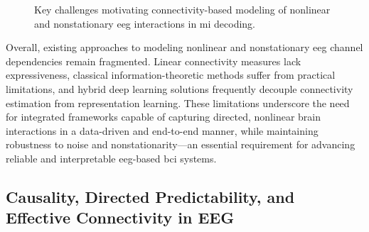 \begin{figure}[H]
\vspace{-1.2em}
\caption{Key challenges motivating connectivity-based modeling of nonlinear and nonstationary \gls{eeg} interactions in \gls{mi} decoding.}
\label{fig:nonlinear_nonstationary_dependencies}
\end{figure}

Overall, existing approaches to modeling nonlinear and nonstationary \gls{eeg} channel dependencies remain fragmented. Linear connectivity measures lack expressiveness, classical information-theoretic methods suffer from practical limitations, and hybrid deep learning solutions frequently decouple connectivity estimation from representation learning. These limitations underscore the need for integrated frameworks capable of capturing directed, nonlinear brain interactions in a data-driven and end-to-end manner, while maintaining robustness to noise and nonstationarity—an essential requirement for advancing reliable and interpretable \gls{eeg}-based \gls{bci} systems.

\subsection{\texorpdfstring{{Causality, Directed Predictability, and Effective Connectivity in EEG}}{Causality, Directed Predictability, and Effective Connectivity in EEG}}
\label{sec:causality_eeg}


